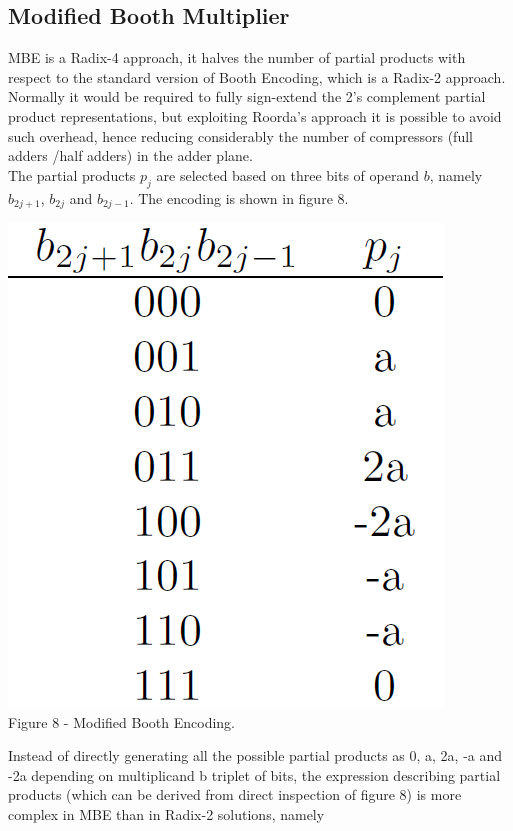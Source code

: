 \documentclass[11pt]{article} %
\begin{document}
\subsection{Modified Booth Multiplier}
MBE is a Radix-4 approach, it halves the number of partial products with respect to the standard version of Booth Encoding, which is a Radix-2 approach. Normally it would be required to fully sign-extend the 2's complement partial product representations, but exploiting Roorda's approach it is possible to avoid such overhead, hence reducing considerably the number of compressors (full adders /half adders) in the adder plane.\\
The partial products $p_j$ are selected based on three bits of operand $b$, namely $b_{2j+1}$, $b_{2j}$ and $b_{2j-1}$. The encoding is shown in figure 8.
\vspace{1em}
\begin{center}
\includegraphics[scale=.30]{mbe.PNG}\\
\small{Figure 8 - Modified Booth Encoding.}
\end{center}
\vspace{1em}
Instead of directly generating all the possible partial products as 0, a, 2a, -a and -2a depending on multiplicand b triplet of bits, the expression describing partial products (which can be derived from direct inspection of figure 8) is more complex
in MBE than in Radix-2 solutions, namely
\end{document}
